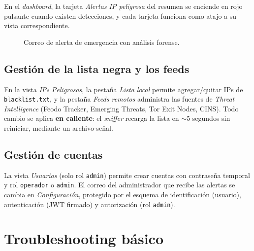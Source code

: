 \documentclass[12pt,letterpaper]{report}
\begin{document}
En el \textit{dashboard}, la tarjeta \textit{Alertas IP peligrosa} del
resumen se enciende en rojo pulsante cuando existen detecciones, y cada
tarjeta funciona como atajo a su vista correspondiente.

\begin{figure}[H]
\centering
{}
\caption{Correo de alerta de emergencia con análisis forense.}
\label{fig:correo}
\end{figure}

\subsection{Gestión de la lista negra y los feeds}

En la vista \textit{IPs Peligrosas}, la pestaña \textit{Lista local} permite
agregar/quitar IPs de \texttt{blacklist.txt}, y la pestaña \textit{Feeds
remotos} administra las fuentes de \textit{Threat Intelligence} (Feodo
Tracker, Emerging Threats, Tor Exit Nodes, CINS). Todo cambio se aplica
\textbf{en caliente}: el \textit{sniffer} recarga la lista en
$\sim$5 segundos sin reiniciar, mediante un archivo-señal.

\subsection{Gestión de cuentas}

La vista \textit{Usuarios} (solo rol \texttt{admin}) permite crear cuentas
con contraseña temporal y rol \texttt{operador} o \texttt{admin}. El correo
del administrador que recibe las alertas se cambia en
\textit{Configuración}, protegido por el esquema de identificación
(usuario), autenticación (JWT firmado) y autorización (rol \texttt{admin}).

\section{Troubleshooting básico}
\end{document}
